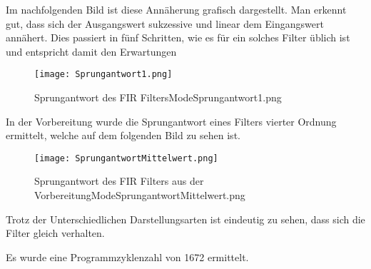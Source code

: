 Im nachfolgenden Bild ist diese Annäherung grafisch dargestellt. Man erkennt gut, dass sich der Ausgangswert sukzessive und linear dem Eingangswert annähert. 
Dies passiert in fünf Schritten, wie es für ein solches Filter üblich ist und entspricht damit den Erwartungen
\begin{figure}[H]
  \centering
    \texttt{[image: Sprungantwort1.png]}
  \caption{Sprungantwort des FIR Filters\textunderscore Mode\textunderscore Sprungantwort1.png}
  \label{fig:SprAW1.png}%
\end{figure}
 In der Vorbereitung wurde die Sprungantwort eines Filters vierter Ordnung ermittelt, welche auf dem folgenden Bild zu sehen ist.
 \begin{figure}[H]
  \centering
    \texttt{[image: SprungantwortMittelwert.png]}
  \caption{Sprungantwort des FIR Filters aus der Vorbereitung\textunderscore Mode\textunderscore SprungantwortMittelwert.png}
  \label{fig:SprAW.png}%
\end{figure}
 Trotz der Unterschiedlichen Darstellungsarten ist eindeutig zu sehen, dass sich die Filter gleich verhalten.
 
 Es wurde eine Programmzyklenzahl von 1672 ermittelt.
 
